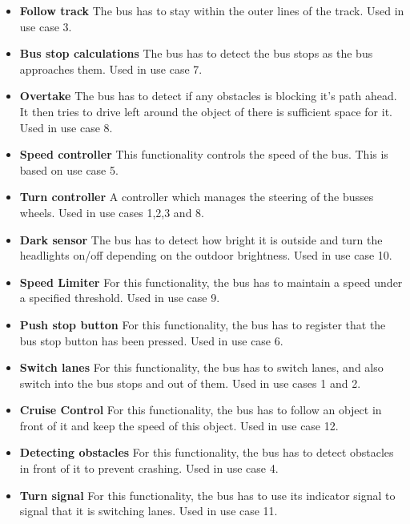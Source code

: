 \begin{itemize}
\item \textbf{Follow track}
The bus has to stay within the outer lines of the track. Used in use case 3.
\item \textbf{Bus stop calculations}
The bus has to detect the bus stops as the bus approaches them. Used in use case 7.
\item \textbf{Overtake}
The bus has to detect if any obstacles is blocking it's path ahead. It then tries to drive left around the object of there is sufficient space for it. Used in use case 8.
\item \textbf{Speed controller}
This functionality controls the speed of the bus. This is based on use case 5.
\item \textbf{Turn controller}
A controller which manages the steering of the busses wheels. Used in use cases 1,2,3 and 8.
\item \textbf{Dark sensor}
The bus has to detect how bright it is outside and turn the headlights on/off depending on the outdoor brightness. Used in use case 10.
\item \textbf{Speed Limiter}
For this functionality, the bus has to maintain a speed under a specified threshold. Used in use case 9.
\item \textbf{Push stop button}
For this functionality, the bus has to register that the bus stop button has been pressed. Used in use case 6.
\item \textbf{Switch lanes}
For this functionality, the bus has to switch lanes, and also switch into the bus stops and out of them. Used in use cases 1 and 2.
\item \textbf{Cruise Control}
For this functionality, the bus has to follow an object in front of it and keep the speed of this object. Used in use case 12.
\item \textbf{Detecting obstacles}
For this functionality, the bus has to detect obstacles in front of it to prevent crashing. Used in use case 4.
\item \textbf{Turn signal}
For this functionality, the bus has to use its indicator signal to signal that it is switching lanes. Used in use case  11.
\end{itemize}

